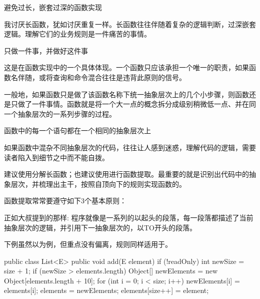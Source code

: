 \begin{content}

\begin{regulation}
避免过长，嵌套过深的函数实现
\end{regulation}

我讨厌长函数，犹如讨厌重复一样。长函数往往伴随着复杂的逻辑判断，过深嵌套逻辑。理解它们的业务规则是一件痛苦的事情。

\begin{regulation}
只做一件事，并做好这件事
\end{regulation}

这是在函数实现中的一个具体体现。一个函数只应该承担一个唯一的职责，如果函数名伴随，或将查询和命令混合往往是违背此原则的信号。

一般地，如果函数只是做了该函数名称下统一抽象层次上的几个小步骤，则函数还是只做了一件事情。函数就是将一个大一点的概念拆分成级别稍微低一点、并在同一个抽象层次的一系列步骤的过程。

\begin{regulation}
函数中的每一个语句都在一个相同的抽象层次上
\end{regulation}

如果函数中混杂不同抽象层次的代码，往往让人感到迷惑，理解代码的逻辑，需要读者陷入到细节之中而不能自拨。

建议使用分解长函数；也建议使用进行函数提取。最重要的就是识别出代码中的抽象层次，并梳理出主干，按照自顶向下的规则实现函数的。

函数提取常常要遵守如下3个基本原则：
\begin{enum}
\end{enum}

正如大叔提到的那样: 程序就像是一系列的以起头的段落，每一段落都描述了当前抽象层次的逻辑，并引用下一抽象层次的，以TO开头的段落。

下例虽然以为例，但重点没有偏离，规则同样适用于。

\begin{leftbar}
\begin{java}
public class List<E> {
   public void add(E element) {
      if (!readOnly) {
         int newSize = size + 1;
         if (newSize > elements.length) {
            Object[] newElements =
               new Object[elements.length + 10];
            for (int i = 0; i < size; i++)
               newElements[i] = elements[i];
            elements = newElements;
         }
         elements[size++] = element;
      }
   }
}
\end{java}
\end{leftbar}


\end{content}
